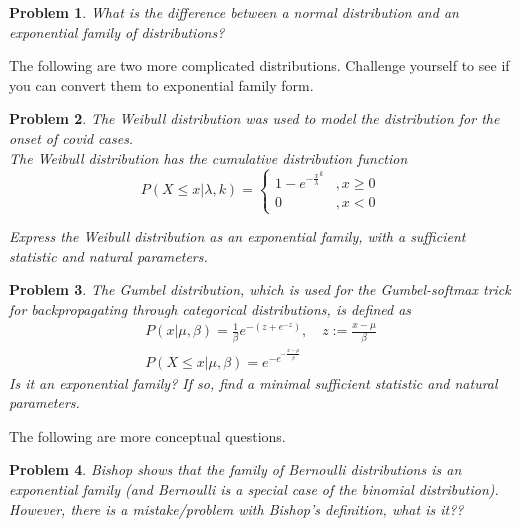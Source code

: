 \documentclass[a4paper]{article}
\newtheorem{problem}{Problem}[section]
\begin{document}
\begin{problem}
  What is the difference between a normal distribution and an exponential family of distributions?
\end{problem}

The following are two more complicated distributions.  Challenge yourself to see if you can convert them to exponential family form.

\begin{problem}
  The Weibull distribution was used to model the distribution for the onset of covid cases.  \\
  The Weibull distribution has the cumulative distribution function
  \begin{equation}
    P( X \leq x \vert \lambda, k ) = \begin{cases}
      1-e^{-\frac{x}{\lambda}^k} &, x \geq 0 \\
      0 &, x <0
    \end{cases}
    \label{}
  \end{equation}

Express the Weibull distribution as an exponential family, with a sufficient statistic and natural parameters.
\end{problem}

\begin{problem}
  The Gumbel distribution, which is used for the Gumbel-softmax trick for backpropagating through categorical distributions, is defined as
  \begin{equation}
    \begin{split}
      P( x \vert \mu, \beta ) = \frac{1}{\beta} e^{-(z+e^{-z})}, \quad z:= \frac{x-\mu}{\beta} \\
      P( X \leq x \vert \mu, \beta ) = e^{-e^{-\frac{x-\mu}{\beta}} }
    \end{split}
    \label{Gumbel}
  \end{equation}
Is it an exponential family?  If so, find a minimal sufficient statistic and natural parameters.
\end{problem}

The following are more conceptual questions.

\begin{problem}
  Bishop shows that the family of Bernoulli distributions is an exponential family (and Bernoulli is a special case of the binomial distribution).  However, there is a mistake/problem with Bishop's definition, what is it??
\end{problem}
\end{document}
